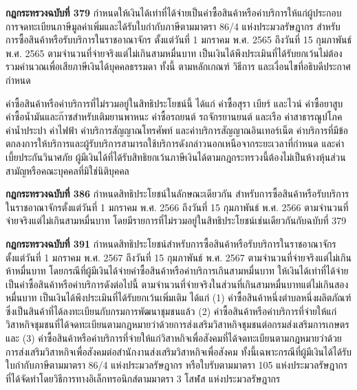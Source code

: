\documentclass[12pt,a4paper]{article}
\begin{document}
\textbf{กฎกระทรวงฉบับที่ 379} กำหนดให้เงินได้เท่าที่ได้จ่ายเป็นค่าซื้อสินค้าหรือค่าบริการให้แก่ผู้ประกอบการจดทะเบียนภาษีมูลค่าเพิ่มและได้รับใบกำกับภาษีตามมาตรา 86/4 แห่งประมวลรัษฎากร สำหรับการซื้อสินค้าหรือรับบริการในราชอาณาจักร ตั้งแต่วันที่ 1 มกราคม พ.ศ. 2565 ถึงวันที่ 15 กุมภาพันธ์ พ.ศ. 2565 ตามจำนวนที่จ่ายจริงแต่ไม่เกินสามหมื่นบาท เป็นเงินได้พึงประเมินที่ได้รับยกเว้นไม่ต้องรวมคำนวณเพื่อเสียภาษีเงินได้บุคคลธรรมดา ทั้งนี้ ตามหลักเกณฑ์ วิธีการ และเงื่อนไขที่อธิบดีประกาศกำหนด

ค่าซื้อสินค้าหรือค่าบริการที่ไม่รวมอยู่ในสิทธิประโยชน์นี้ ได้แก่ ค่าซื้อสุรา เบียร์ และไวน์ ค่าซื้อยาสูบ ค่าซื้อน้ำมันและก๊าซสำหรับเติมยานพาหนะ ค่าซื้อรถยนต์ รถจักรยานยนต์ และเรือ ค่าสาธารณูปโภค ค่าน้ำประปา ค่าไฟฟ้า ค่าบริการสัญญาณโทรศัพท์ และค่าบริการสัญญาณอินเทอร์เน็ต ค่าบริการที่มีข้อตกลงการให้บริการและผู้รับบริการสามารถใช้บริการดังกล่าวนอกเหนือจากระยะเวลาที่กำหนด และค่าเบี้ยประกันวินาศภัย ผู้มีเงินได้ที่ได้รับสิทธิยกเว้นภาษีเงินได้ตามกฎกระทรวงนี้ต้องไม่เป็นห้างหุ้นส่วนสามัญหรือคณะบุคคลที่มิใช่นิติบุคคล

\textbf{กฎกระทรวงฉบับที่ 386} กำหนดสิทธิประโยชน์ในลักษณะเดียวกัน สำหรับการซื้อสินค้าหรือรับบริการในราชอาณาจักรตั้งแต่วันที่ 1 มกราคม พ.ศ. 2566 ถึงวันที่ 15 กุมภาพันธ์ พ.ศ. 2566 ตามจำนวนที่จ่ายจริงแต่ไม่เกินสามหมื่นบาท โดยมีรายการที่ไม่รวมอยู่ในสิทธิประโยชน์เช่นเดียวกันกับฉบับที่ 379

\textbf{กฎกระทรวงฉบับที่ 391} กำหนดสิทธิประโยชน์สำหรับการซื้อสินค้าหรือรับบริการในราชอาณาจักรตั้งแต่วันที่ 1 มกราคม พ.ศ. 2567 ถึงวันที่ 15 กุมภาพันธ์ พ.ศ. 2567 ตามจำนวนที่จ่ายจริงแต่ไม่เกินห้าหมื่นบาท โดยกรณีที่ผู้มีเงินได้จ่ายค่าซื้อสินค้าหรือค่าบริการเกินสามหมื่นบาท ให้เงินได้เท่าที่ได้จ่ายเป็นค่าซื้อสินค้าหรือค่าบริการดังต่อไปนี้ ตามจำนวนที่จ่ายจริงในส่วนที่เกินสามหมื่นบาทแต่ไม่เกินสองหมื่นบาท เป็นเงินได้พึงประเมินที่ได้รับยกเว้นเพิ่มเติม ได้แก่ (1) ค่าซื้อสินค้าหนึ่งตำบลหนึ่งผลิตภัณฑ์ซึ่งเป็นสินค้าที่ได้ลงทะเบียนกับกรมการพัฒนาชุมชนแล้ว (2) ค่าซื้อสินค้าหรือค่าบริการที่จ่ายให้แก่วิสาหกิจชุมชนที่ได้จดทะเบียนตามกฎหมายว่าด้วยการส่งเสริมวิสาหกิจชุมชนต่อกรมส่งเสริมการเกษตร และ (3) ค่าซื้อสินค้าหรือค่าบริการที่จ่ายให้แก่วิสาหกิจเพื่อสังคมที่ได้จดทะเบียนตามกฎหมายว่าด้วยการส่งเสริมวิสาหกิจเพื่อสังคมต่อสำนักงานส่งเสริมวิสาหกิจเพื่อสังคม ทั้งนี้เฉพาะกรณีที่ผู้มีเงินได้ได้รับใบกำกับภาษีตามมาตรา 86/4 แห่งประมวลรัษฎากร หรือใบรับตามมาตรา 105 แห่งประมวลรัษฎากร ที่ได้จัดทำโดยวิธีการทางอิเล็กทรอนิกส์ตามมาตรา 3 โสฬส แห่งประมวลรัษฎากร
\end{document}
